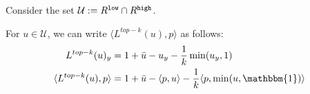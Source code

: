 \documentclass[12pt]{article}
\newcommand{\Comments}{1}
\newcommand{\mynote}[2]{\ifnum\Comments=1\textcolor{#1}{#2}\fi}
\newcommand{\raf}[1]{\mynote{green}{[RF: #1]}}
\newcommand{\jessie}[1]{\mynote{purple}{[JF: #1]}}
\newcommand{\simplex}{\Delta_\Y}
\newcommand{\R}{\mathcal{R}}
\newcommand{\U}{\mathcal{U}}
\newcommand{\Y}{\mathcal{Y}}
\newcommand{\inprod}[2]{\langle #1, #2 \rangle}%
\newcommand{\ones}{\mathbbm{1}}
\newtheorem{lemma}{Lemma}
\begin{document}
Consider the set $\U := R^{\tt low} \cap R^{\tt high}$.

For $u \in \U$, we can write $\inprod{L^{top-k}(u)}{p}$ as follows:
\begin{align*}
L^{top-k}(u)_y &= 1 + \bar u - u_y - \frac 1 k \min(u_y, 1)\\
\inprod{L^{top-k}(u)}{p} &= 1 + \bar u - \inprod{p}{u} - \frac 1 k \inprod{p}{\min(u, \ones)}
\end{align*}


%	
\end{document}

